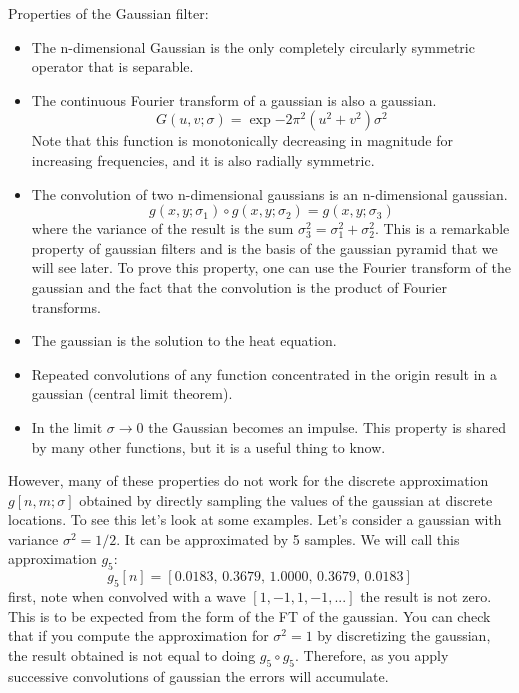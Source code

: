 Properties of the Gaussian filter:
\begin{itemize}
\item The n-dimensional Gaussian is the only completely circularly symmetric operator that is separable. 

\item The continuous Fourier transform of a gaussian is also a gaussian. 
\begin{equation}
G (u,v; \sigma) = \exp{- 2 \pi^2 (u^2 +  v^2) \sigma^2}
\label{eq:FTgauss2d}
\end{equation}
Note that this function is monotonically decreasing in magnitude for increasing frequencies, and it is also radially symmetric. 

\item The convolution of two n-dimensional gaussians is an n-dimensional gaussian.  
\begin{equation}
g (x,y; \sigma_1 ) \circ g (x,y; \sigma_2)  = g (x,y; \sigma_3)
\end{equation}
where the variance of the result is the sum $\sigma_3^2 = \sigma_1^2 + \sigma_2^2$. This is a remarkable property of gaussian filters and is the basis of the gaussian pyramid that we will see later. To prove this property, one can use the Fourier transform of the gaussian and the fact that the convolution is the product of Fourier transforms.

\item The gaussian is the solution to the heat equation. 

\item Repeated convolutions of any function concentrated in the origin result in a gaussian (central limit theorem).

\item In the limit $\sigma \rightarrow 0$ the Gaussian becomes an impulse. This property is shared by many other functions, but it is a useful thing to know.
\end{itemize}

However, many of these properties do not work for the discrete approximation $g\left[n,m;\sigma \right]$ obtained by directly sampling the values of the gaussian at discrete locations. To see this let's look at some examples. Let's consider a gaussian with variance $\sigma^2=1/2$. It can be approximated by 5 samples. We will call this approximation $g_5$:
\begin{equation}
g_5\left[ n \right] = \left[0.0183, \,    0.3679, \,    1.0000, \,    0.3679, \,    0.0183 \right] 
\end{equation}
first, note when convolved with a wave $\left[1,-1,1,-1,...\right]$ the result is not zero. This is to be expected from the form of the FT of the gaussian. You can check that if you  compute the approximation for $\sigma^2=1$ by discretizing the gaussian, the result obtained is not equal to doing $g_5 \circ g_5$. Therefore, as you apply successive convolutions of gaussian the errors will accumulate. 

